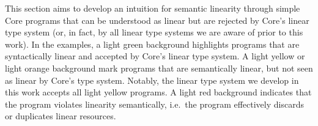 \documentclass[acmsmall,review,screen]{acmart}
\newcommand{\workingcolorname}{light green}
\newcommand{\notyetcolorname}{light yellow}
\newcommand{\nowaycolorname}{light red}
\newcommand{\limitationcolorname}{light orange}
\begin{document}
This section aims to develop an intuition for semantic linearity through simple
Core programs that can be understood as linear but are rejected by Core's
linear type system (or, in fact, by all linear type systems we are
aware of prior to this work).
%
%
%
In the examples, a \colorbox{working}{\workingcolorname} background highlights
programs that are syntactically linear and accepted by Core's linear type
system.
%
A \colorbox{notyet}{\notyetcolorname} or
\colorbox{limitation}{\limitationcolorname} background mark programs that are
semantically linear, but not seen as linear by Core's type system.
%
Notably, the linear type system we develop in this work accepts all
\colorbox{notyet}{\notyetcolorname} programs.
%
A \colorbox{noway}{\nowaycolorname} background indicates that the program
violates linearity semantically, i.e.~the program effectively
discards or duplicates linear resources.


\end{document}
